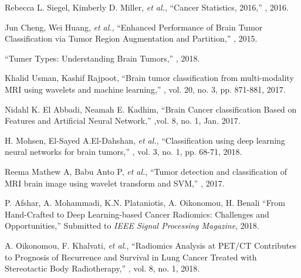 \documentclass{article}
\begin{document}
\begin{thebibliography}{10}

Rebecca L. Siegel, Kimberly D. Miller, \textit{et al.},
\newblock ``Cancer Statistics, 2016,''
, 2016.

Jun Cheng, Wei Huang, \textit{et al.},
\newblock ``Enhanced Performance of Brain Tumor Classification via Tumor Region Augmentation and Partition,''
, 2015.

\newblock 	``Tumer Types: Understanding Brain Tumors,''
, 2018.

Khalid Usman, Kashif Rajpoot,
\newblock ``Brain tumor classification from multi-modality MRI using wavelets and machine learning,''
, vol. 20, no. 3, pp. 871-881, 2017.

Nidahl K. El Abbadi, Neamah E. Kadhim,
\newblock ``Brain Cancer classification Based on Features and Artificial Neural Network,''
,vol. 8, no. 1, Jan. 2017.

H. Mohsen, El-Sayed A.El-Dahshan, \textit{et al.},
\newblock ``Classification using deep learning neural networks for brain tumors,''
, vol. 3, no. 1, pp. 68-71, 2018.

Reema Mathew A, Babu Anto P, \textit{et al.},
\newblock ``Tumor detection and classification of MRI brain image using wavelet transform and SVM,''
, 2017.

P. Afshar, A. Mohammadi, K.N. Plataniotis, A. Oikonomou, H. Benali
\newblock ``From Hand-Crafted to Deep Learning-based Cancer Radiomics: Challenges and Opportunities,''
\newblock Submitted to {\em IEEE Signal Processing Magazine}, 2018.

A. Oikonomou, F. Khalvati, {\em et al.},
\newblock ``Radiomics Analysis at PET/CT Contributes to Prognosis of Recurrence and Survival in Lung Cancer Treated with Stereotactic Body Radiotherapy,''
, vol. 8, no. 1, 2018.


\end{thebibliography}
\end{document}
